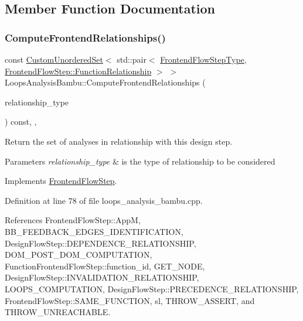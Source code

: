 \subsection{Member Function Documentation}
\mbox{\label{classLoopsAnalysisBambu_aaec0d9291ce9081fe0e7b3c71bd76928}} 
\subsubsection{\texorpdfstring{Compute\+Frontend\+Relationships()}{ComputeFrontendRelationships()}}
{\footnotesize\ttfamily const \hyperlink{classCustomUnorderedSet}{Custom\+Unordered\+Set}$<$ std\+::pair$<$ \hyperlink{frontend__flow__step_8hpp_afeb3716c693d2b2e4ed3e6d04c3b63bb}{Frontend\+Flow\+Step\+Type}, \hyperlink{classFrontendFlowStep_af7cf30f2023e5b99e637dc2058289ab0}{Frontend\+Flow\+Step\+::\+Function\+Relationship} $>$ $>$ Loops\+Analysis\+Bambu\+::\+Compute\+Frontend\+Relationships (\begin{DoxyParamCaption}\item[{const \hyperlink{classDesignFlowStep_a723a3baf19ff2ceb77bc13e099d0b1b7}{Design\+Flow\+Step\+::\+Relationship\+Type}}]{relationship\+\_\+type }\end{DoxyParamCaption}) const\hspace{0.3cm}{\ttfamily [override]}, {\ttfamily [private]}, {\ttfamily [virtual]}}



Return the set of analyses in relationship with this design step. 


\begin{DoxyParams}{Parameters}
{\em relationship\+\_\+type} & is the type of relationship to be considered \\
\hline
\end{DoxyParams}


Implements \hyperlink{classFrontendFlowStep_abeaff70b59734e462d347ed343dd700d}{Frontend\+Flow\+Step}.



Definition at line 78 of file loops\+\_\+analysis\+\_\+bambu.\+cpp.



References Frontend\+Flow\+Step\+::\+AppM, B\+B\+\_\+\+F\+E\+E\+D\+B\+A\+C\+K\+\_\+\+E\+D\+G\+E\+S\+\_\+\+I\+D\+E\+N\+T\+I\+F\+I\+C\+A\+T\+I\+ON, Design\+Flow\+Step\+::\+D\+E\+P\+E\+N\+D\+E\+N\+C\+E\+\_\+\+R\+E\+L\+A\+T\+I\+O\+N\+S\+H\+IP, D\+O\+M\+\_\+\+P\+O\+S\+T\+\_\+\+D\+O\+M\+\_\+\+C\+O\+M\+P\+U\+T\+A\+T\+I\+ON, Function\+Frontend\+Flow\+Step\+::function\+\_\+id, G\+E\+T\+\_\+\+N\+O\+DE, Design\+Flow\+Step\+::\+I\+N\+V\+A\+L\+I\+D\+A\+T\+I\+O\+N\+\_\+\+R\+E\+L\+A\+T\+I\+O\+N\+S\+H\+IP, L\+O\+O\+P\+S\+\_\+\+C\+O\+M\+P\+U\+T\+A\+T\+I\+ON, Design\+Flow\+Step\+::\+P\+R\+E\+C\+E\+D\+E\+N\+C\+E\+\_\+\+R\+E\+L\+A\+T\+I\+O\+N\+S\+H\+IP, Frontend\+Flow\+Step\+::\+S\+A\+M\+E\+\_\+\+F\+U\+N\+C\+T\+I\+ON, sl, T\+H\+R\+O\+W\+\_\+\+A\+S\+S\+E\+RT, and T\+H\+R\+O\+W\+\_\+\+U\+N\+R\+E\+A\+C\+H\+A\+B\+LE.


